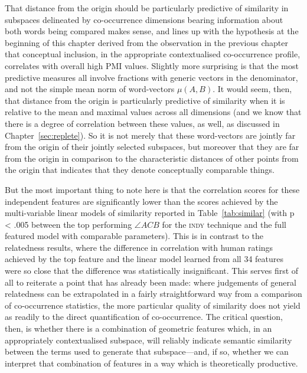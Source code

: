 That distance from the origin should be particularly predictive of similarity in subspaces delineated by co-occurrence dimensions bearing information about both words being compared makes sense, and lines up with the hypothesis at the beginning of this chapter derived from the observation in the previous chapter that conceptual inclusion, in the appropriate contextualised co-occurrence profile, correlates with overall high PMI values.  Slightly more surprising is that the most predictive measures all involve fractions with generic vectors in the denominator, and not the simple mean norm of word-vectors $\mu(A,B)$.  It would seem, then, that distance from the origin is particularly predictive of similarity when it is relative to the mean and maximal values across all dimensions (and we know that there is a degree of correlation between these values, as well, as discussed in Chapter~\ref{sec:replete}).  So it is not merely that these word-vectors are jointly far from the origin of their jointly selected subspaces, but moreover that they are far from the origin in comparison to the characteristic distances of other points from the origin that indicates that they denote conceptually comparable things.

But the most important thing to note here is that the correlation scores for these independent features are significantly lower than the scores achieved by the multi-variable linear models of similarity reported in Table~\ref{tab:similar} (with p < .005 between the top performing $\angle ACB$ for the \textsc{indy} technique and the full featured model with comparable parameters).  This is in contrast to the relatedness results, where the difference in correlation with human ratings achieved by the top feature and the linear model learned from all 34 features were so close that the difference was statistically insignificant.  This serves first of all to reiterate a point that has already been made: where judgements of general relatedness can be extrapolated in a fairly straightforward way from a comparison of co-occurrence statistics, the more particular quality of similarity does not yield as readily to the direct quantification of co-occurrence.  The critical question, then, is whether there is a combination of geometric features which, in an appropriately contextualised subspace, will reliably indicate semantic similarity between the terms used to generate that subspace---and, if so, whether we can interpret that combination of features in a way which is theoretically productive.


